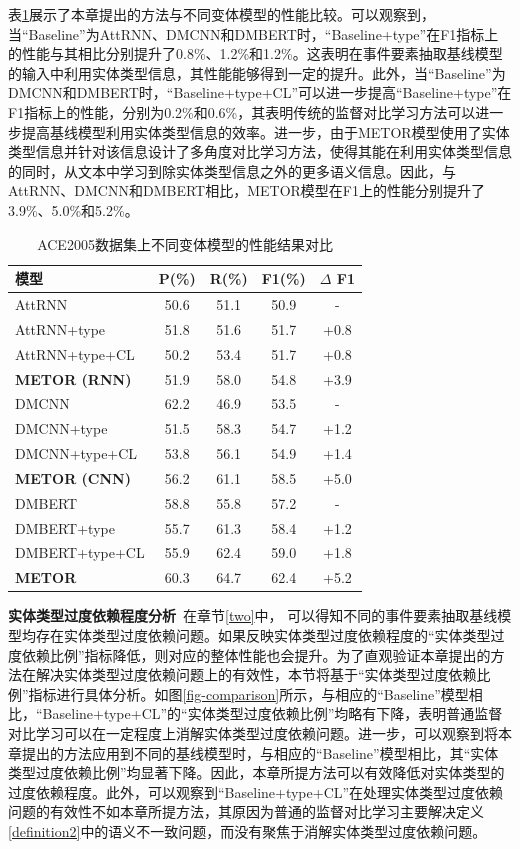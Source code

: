 表\ref{analysis}展示了本章提出的方法与不同变体模型的性能比较。可以观察到，当“Baseline”为AttRNN、DMCNN和DMBERT时，“Baseline+type”在F1指标上的性能与其相比分别提升了0.8\%、1.2\%和1.2\%。这表明在事件要素抽取基线模型的输入中利用实体类型信息，其性能能够得到一定的提升。此外，当“Baseline”为DMCNN和DMBERT时，“Baseline+type+CL”可以进一步提高“Baseline+type”在F1指标上的性能，分别为0.2\%和0.6\%，其表明传统的监督对比学习方法可以进一步提高基线模型利用实体类型信息的效率。进一步，由于METOR模型使用了实体类型信息并针对该信息设计了多角度对比学习方法，使得其能在利用实体类型信息的同时，从文本中学习到除实体类型信息之外的更多语义信息。因此，与AttRNN、DMCNN和DMBERT相比，METOR模型在F1上的性能分别提升了3.9\%、5.0\%和5.2\%。

\begin{table}[htp]
\centering
\caption{ACE2005数据集上不同变体模型的性能结果对比}
\label{analysis}
\begin{tabular}{l|cccc}
\toprule
模型  & P(\%) & R(\%) & F1(\%) & $\Delta$ F1\\ \midrule
AttRNN  & 50.6  & 51.1 & 50.9 & -  \\
AttRNN+type & 51.8 & 51.6  & 51.7 & +0.8\\
AttRNN+type+CL & 50.2 & 53.4  & 51.7 & +0.8\\ 
\textbf{METOR (RNN)}  & 51.9  &  58.0 &  54.8  & +3.9\\
\midrule
DMCNN  & 62.2  & 46.9  & 53.5 & - \\
DMCNN+type  & 51.5  & 58.3  & 54.7 & +1.2\\
DMCNN+type+CL & 53.8  & 56.1  & 54.9  &  +1.4\\ 
\textbf{METOR (CNN)} & 56.2 & 61.1 & 58.5 & +5.0\\
\midrule
DMBERT & 58.8  & 55.8 & 57.2 & - \\
DMBERT+type & 55.7  & 61.3  & 58.4 & +1.2\\
DMBERT+type+CL &  55.9 & 62.4  &  59.0  & +1.8\\ 
\textbf{METOR} & 60.3  & 64.7  & 62.4  & +5.2\\
\bottomrule
\end{tabular}
\end{table}

\textbf{实体类型过度依赖程度分析}~在章节\ref{two}中，
可以得知不同的事件要素抽取基线模型均存在实体类型过度依赖问题。如果反映实体类型过度依赖程度的“实体类型过度依赖比例”指标降低，则对应的整体性能也会提升。为了直观验证本章提出的方法在解决实体类型过度依赖问题上的有效性，本节将基于“实体类型过度依赖比例”指标进行具体分析。如图\ref{fig-comparison}所示，与相应的“Baseline”模型相比，“Baseline+type+CL”的“实体类型过度依赖比例”均略有下降，表明普通监督对比学习可以在一定程度上消解实体类型过度依赖问题。进一步，可以观察到将本章提出的方法应用到不同的基线模型时，与相应的“Baseline”模型相比，其“实体类型过度依赖比例”均显著下降。因此，本章所提方法可以有效降低对实体类型的过度依赖程度。此外，可以观察到“Baseline+type+CL”在处理实体类型过度依赖问题的有效性不如本章所提方法，其原因为普通的监督对比学习主要解决定义\ref{definition2}中的语义不一致问题，而没有聚焦于消解实体类型过度依赖问题。

